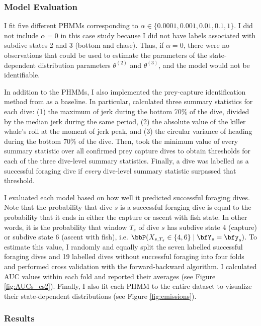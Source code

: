 \subsubsection{Model Evaluation}

I fit five different PHMMs corresponding to $\alpha \in \{0.0001,0.001,0.01,0.1,1\}$. I did not include $\alpha = 0$ in this case study because I did not have labels associated with subdive states 2 and 3 (bottom and chase). Thus, if $\alpha = 0$, there were no observations that could be used to estimate the parameters of the state-dependent distribution parameters $\theta^{(2)}$ and $\theta^{(3)}$, and the model would not be identifiable. 

In addition to the PHMMs, I also implemented the prey-capture identification method from \citet{Tennessen:2019a} as a baseline. In particular, \citeauthor{Tennessen:2019a} calculated three summary statistics for each dive: (1) the maximum of jerk during the bottom 70\% of the dive, divided by the median jerk during the same period, (2) the absolute value of the killer whale's roll at the moment of jerk peak, and (3) the circular variance of heading during the bottom 70\% of the dive. Then, \citeauthor{Tennessen:2019a} took the minimum value of every summary statistic over all confirmed prey capture dives to obtain thresholds for each of the three dive-level summary statistics. Finally, a dive was labelled as a successful foraging dive if \textit{every} dive-level summary statistic surpassed that threshold.

I evaluated each model based on how well it predicted successful foraging dives. Note that the probability that dive $s$ is a successful foraging dive is equal to the probability that it ends in either the capture or ascent with fish state. In other words, it is the probability that window $T_s$ of dive $s$ has subdive state 4 (capture) or subdive state 6 (ascent with fish), i.e. $\bbP(X_{s,T_s} \in \{4,6\} \mid \bfY_s = \bfy_s)$. To estimate this value, I randomly and equally split the seven labelled successful foraging dives and 19 labelled dives without successful foraging into four folds and performed cross validation with the forward-backward algorithm. I calculated AUC values within each fold and reported their averages (see Figure \ref{fig:AUCs_cs2}). Finally, I also fit each PHMM to the entire dataset to visualize their state-dependent distributions (see Figure \ref{fig:emissions}). 

\subsubsection{Results}

